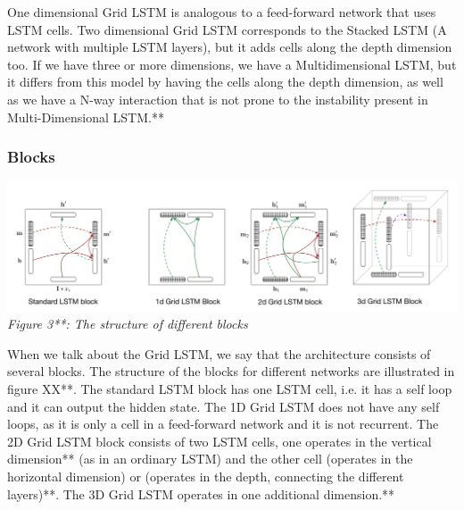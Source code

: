 \documentclass{article} %
\begin{document}
One dimensional Grid LSTM is analogous to a feed-forward network that uses LSTM cells. Two dimensional Grid LSTM corresponds to the Stacked LSTM (A network with multiple LSTM layers), but it adds cells along the depth dimension too. If we have three or more dimensions, we have a Multidimensional LSTM, but it differs from this model by having the cells along the depth dimension, as well as we have a N-way interaction that is not prone to the instability present in Multi-Dimensional LSTM.**


\subsubsection{Blocks}
\includegraphics[scale=0.4]{gridblocks} \newline
\textit{Figure 3**: The structure of different blocks}

 When we talk about the Grid LSTM, we say that the architecture consists of several blocks. The structure of the blocks for different networks are illustrated in figure XX**. The standard LSTM block has one LSTM cell, i.e. it has a self loop and it can output the hidden state. The 1D Grid LSTM does not have any self loops, as it is only a cell in a feed-forward network and it is not recurrent. The 2D Grid LSTM block consists of two LSTM cells, one operates in the vertical dimension** (as in an ordinary LSTM) and the other cell (operates in the horizontal dimension) or (operates in the depth, connecting the different layers)**. The 3D Grid LSTM operates in one additional dimension.** 
\end{document}

